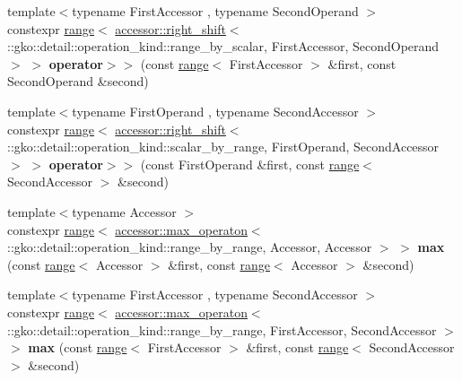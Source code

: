 \begin{DoxyCompactItemize}
\item 
\mbox{\label{namespacegko_a0467ed5f04ab215c0c5639f0a4f880b5}} 
{\footnotesize template$<$typename First\+Accessor , typename Second\+Operand $>$ }\\constexpr \hyperlink{classgko_1_1range}{range}$<$ \hyperlink{structgko_1_1accessor_1_1right__shift}{accessor\+::right\+\_\+shift}$<$ \+::gko\+::detail\+::operation\+\_\+kind\+::range\+\_\+by\+\_\+scalar, First\+Accessor, Second\+Operand $>$ $>$ {\bfseries operator$>$$>$} (const \hyperlink{classgko_1_1range}{range}$<$ First\+Accessor $>$ \&first, const Second\+Operand \&second)
\item 
\mbox{\label{namespacegko_a7fb6c9447f2f6620551a3c6900f290fd}} 
{\footnotesize template$<$typename First\+Operand , typename Second\+Accessor $>$ }\\constexpr \hyperlink{classgko_1_1range}{range}$<$ \hyperlink{structgko_1_1accessor_1_1right__shift}{accessor\+::right\+\_\+shift}$<$ \+::gko\+::detail\+::operation\+\_\+kind\+::scalar\+\_\+by\+\_\+range, First\+Operand, Second\+Accessor $>$ $>$ {\bfseries operator$>$$>$} (const First\+Operand \&first, const \hyperlink{classgko_1_1range}{range}$<$ Second\+Accessor $>$ \&second)
\item 
\mbox{\label{namespacegko_a9525dbd3cab0f88c517605970eeec941}} 
{\footnotesize template$<$typename Accessor $>$ }\\constexpr \hyperlink{classgko_1_1range}{range}$<$ \hyperlink{structgko_1_1accessor_1_1max__operaton}{accessor\+::max\+\_\+operaton}$<$ \+::gko\+::detail\+::operation\+\_\+kind\+::range\+\_\+by\+\_\+range, Accessor, Accessor $>$ $>$ {\bfseries max} (const \hyperlink{classgko_1_1range}{range}$<$ Accessor $>$ \&first, const \hyperlink{classgko_1_1range}{range}$<$ Accessor $>$ \&second)
\item 
\mbox{\label{namespacegko_a6953ed43df70b724348be1ee86e086c0}} 
{\footnotesize template$<$typename First\+Accessor , typename Second\+Accessor $>$ }\\constexpr \hyperlink{classgko_1_1range}{range}$<$ \hyperlink{structgko_1_1accessor_1_1max__operaton}{accessor\+::max\+\_\+operaton}$<$ \+::gko\+::detail\+::operation\+\_\+kind\+::range\+\_\+by\+\_\+range, First\+Accessor, Second\+Accessor $>$ $>$ {\bfseries max} (const \hyperlink{classgko_1_1range}{range}$<$ First\+Accessor $>$ \&first, const \hyperlink{classgko_1_1range}{range}$<$ Second\+Accessor $>$ \&second)

\end{DoxyCompactItemize}
